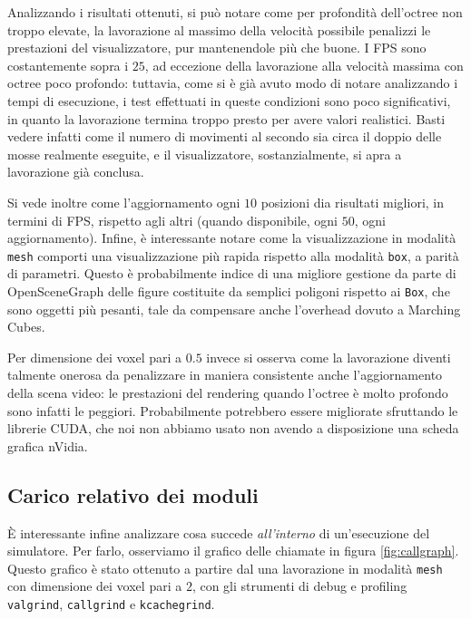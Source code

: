 Analizzando i risultati ottenuti, si può notare come per profondità dell'octree non troppo elevate, la lavorazione al massimo della velocità possibile penalizzi le prestazioni del visualizzatore, pur mantenendole più che buone. I FPS sono costantemente sopra i $25$, ad eccezione della lavorazione alla velocità massima con octree poco profondo: tuttavia, come si è già avuto modo di notare analizzando i tempi di esecuzione, i test effettuati in queste condizioni sono poco significativi, in quanto la lavorazione termina troppo presto per avere valori realistici. Basti vedere infatti come il numero di movimenti al secondo sia circa il doppio delle mosse realmente eseguite, e il visualizzatore, sostanzialmente, si apra a lavorazione già conclusa.

Si vede inoltre come l'aggiornamento ogni $10$ posizioni dia risultati migliori, in termini di FPS, rispetto agli altri (quando disponibile, ogni $50$, ogni aggiornamento). Infine, è interessante notare come la visualizzazione in modalità \texttt{mesh} comporti una visualizzazione più rapida rispetto alla modalità \texttt{box}, a parità di parametri. Questo è probabilmente indice di una migliore gestione da parte di OpenSceneGraph delle figure costituite da semplici poligoni rispetto ai \texttt{Box}, che sono oggetti più pesanti, tale da compensare anche l'overhead dovuto a Marching Cubes.

Per dimensione dei voxel pari a $0.5$ invece si osserva come la lavorazione diventi talmente onerosa da penalizzare in maniera consistente anche l'aggiornamento della scena video: le prestazioni del rendering quando l'octree è molto profondo sono infatti le peggiori. Probabilmente potrebbero essere migliorate sfruttando le librerie CUDA, che noi non abbiamo usato non avendo a disposizione una scheda grafica nVidia.

\subsection{Carico relativo dei moduli}
È interessante infine analizzare cosa succede \textit{all'interno} di un'esecuzione del simulatore. Per farlo, osserviamo il grafico delle chiamate in figura \ref{fig:callgraph}. Questo grafico è stato ottenuto a partire dal una lavorazione in modalità \texttt{mesh} con dimensione dei voxel pari a $2$, con gli strumenti di debug e profiling \texttt{valgrind}, \texttt{callgrind} e \texttt{kcachegrind}.

